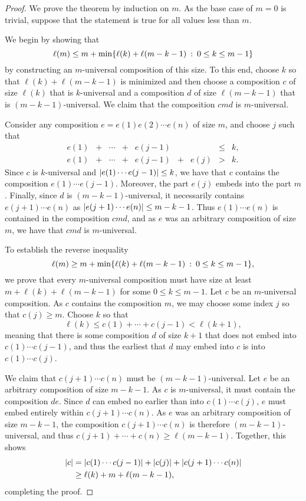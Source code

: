 \begin{proof}
	We prove the theorem by induction on $m$. As the base case of $m = 0$ is trivial, suppose that the statement is true for all values less than $m$.

	We begin by showing that
	\[
		\ell(m)
		\le
		m + \min\{\ell(k) + \ell(m-k-1) \::\: 0 \le k \le m-1\}
	\]
	by constructing an $m$-universal composition of this size. To this end, choose $k$ so that $\ell(k) + \ell(m-k-1)$ is minimized and then choose a composition $c$ of size $\ell(k)$ that is $k$-universal and a composition $d$ of size $\ell(m-k-1)$ that is $(m-k-1)$-universal. We claim that the composition $c m d$ is $m$-universal. 

	Consider any composition $e = e(1) e(2) \cdots e(n)$ of size $m$, and choose $j$ such that
	\[
		\begin{array}{lccclclcl}
			e(1) &+& \cdots &+& e(j-1) & &      &\le& k,\\
			e(1) &+& \cdots &+& e(j-1) &+& e(j) & > & k.
		\end{array}
	\]
	Since $c$ is $k$-universal and $\left\lvert{e(1) \cdots e(j-1)}\right\rvert \le k$, we have that $c$ contains the composition $e(1) \cdots e(j-1)$. Moreover, the part $e(j)$ embeds into the part $m$. Finally, since $d$ is $(m-k-1)$-universal, it necessarily contains $e(j+1) \cdots e(n)$ as $\left\lvert{e(j+1) \cdots e(n)}\right\rvert \le m - k -1$. Thus $e(1) \cdots e(n)$ is contained in the composition $c m d$, and as $e$ was an arbitrary composition of size $m$, we have that $c m d$ is $m$-universal.

	To establish the reverse inequality 
	\[
		\ell(m)
		\ge
		m + \min\{\ell(k) + \ell(m-k-1) \::\: 0 \le k \le m-1\},
	\]
	we prove that every $m$-universal composition must have size at least $m + \ell(k) + \ell(m-k-1)$ for some $0 \le k \le m-1$. Let $c$ be an $m$-universal composition. As $c$ contains the composition $m$, we may choose some index $j$ so that $c(j) \ge m$. Choose $k$ so that
	\[
		\ell(k) \le c(1) + \cdots + c(j-1) < \ell(k+1),
	\]
	meaning that there is some composition $d$ of size $k+1$ that does not embed into $c(1) \cdots c(j-1)$, and thus the earliest that $d$ may embed into $c$ is into $c(1) \cdots c(j)$. 

	We claim that $c(j+1) \cdots c(n)$ must be $(m-k-1)$-universal. Let $e$ be an arbitrary composition of size $m-k-1$. As $c$ is $m$-universal, it must contain the composition $de$. Since $d$ can embed no earlier than into $c(1) \cdots c(j)$, $e$ must embed entirely within $c(j+1) \cdots c(n)$. As $e$ was an arbitrary composition of size $m-k-1$, the composition $c(j+1) \cdots c(n)$ is therefore $(m-k-1)$-universal, and thus $c(j+1) + \cdots + c(n) \ge \ell(m-k-1)$. Together, this shows
	\begin{align*}
		\left\lvert{c}\right\rvert
			&= \left\lvert{c(1) \cdots c(j-1)}\right\rvert + \left\lvert{c(j)}\right\rvert + \left\lvert{c(j+1) \cdots c(n)}\right\rvert \\
			&\ge \ell(k) + m + \ell(m-k-1),
	\end{align*}
	completing the proof.
\end{proof}


